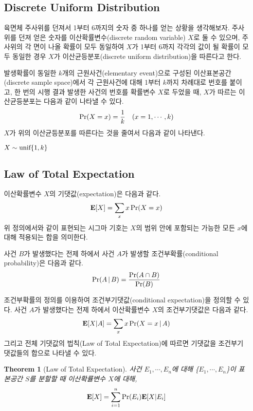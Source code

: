 \documentclass[11pt]{article}
\newtheorem*{theorem_}{Theorem}
\begin{document}
\subsection{Discrete Uniform Distribution}
육면체 주사위를 던져서 1부터 6까지의 숫자 중 하나를 얻는 상황을 생각해보자. 주사위를 던져 얻은 숫자를 이산확률변수(discrete random variable) $X$로 둘 수 있으며, 주사위의 각 면이 나올 확률이 모두 동일하여 $X$가 1부터 6까지 각각의 값이 될 확률이 모두 동일한 경우 $X$가 이산균등분포(discrete uniform distribution)을 따른다고 한다.

발생확률이 동일한 $k$개의 근원사건(elementary event)으로 구성된 이산표본공간(discrete sample space)에서 각 근원사건에 대해 1부터 $k$까지 차례대로 번호를 붙이고, 한 번의 시행 결과 발생한 사건의 번호를 확률변수 $X$로 두었을 때, $X$가 따르는 이산균등분포는 다음과 같이 나타낼 수 있다.
\[\textnormal{Pr}(X = x) = \frac{1}{k} \quad(x = 1,\cdots, k)\]
$X$가 위의 이산균등분포를 따른다는 것을 줄여서 다음과 같이 나타낸다.
\begin{center}
$X \sim \textnormal{unif}\{1, k\}$
\end{center}

\subsection{Law of Total Expectation}
이산확률변수 $X$의 기댓값(expectation)은 다음과 같다.
\[\textbf{E}[X] = \sum_{x} x\,\textnormal{Pr}(X = x)\]
위 정의에서와 같이 표현되는 시그마 기호는 $X$의 범위 안에 포함되는 가능한 모든 $x$에 대해 적용되는 합을 의미한다.

사건 $B$가 발생했다는 전제 하에서 사건 $A$가 발생할 조건부확률(conditional probability)은 다음과 같다.
\[\textnormal{Pr}(A\,|\,B) = \frac{\textnormal{Pr}(A \cap B)}{\textnormal{Pr}(B)}\]

조건부확률의 정의를 이용하여 조건부기댓값(conditional expectation)을 정의할 수 있다. 사건 $A$가 발생했다는 전제 하에서 이산확률변수 $X$의 조건부기댓값은 다음과 같다.
\[\textbf{E}[X|A] = \sum_{x} x\,\textnormal{Pr}(X = x\,|\,A)\]
그리고 전체 기댓값의 법칙(Law of Total Expectation)에 따르면 기댓값을 조건부기댓값들의 합으로 나타낼 수 있다.

\singlespacing
\begin{theorem_}[Law of Total Expectation]
사건 $E_{1}, \cdots , E_{n}$에 대해 \{$E_{1}, \cdots , E_{n}$\}이 표본공간 $S$를 분할할 때 이산확률변수 $X$에 대해,
\[\textnormal{\textbf{E}}[X] = \sum_{i=1}^{n} \textnormal{Pr}(E_{i})\textnormal{\textbf{E}}[X|E_{i}]\]

\end{theorem_}
\doublespacing
\end{document}

